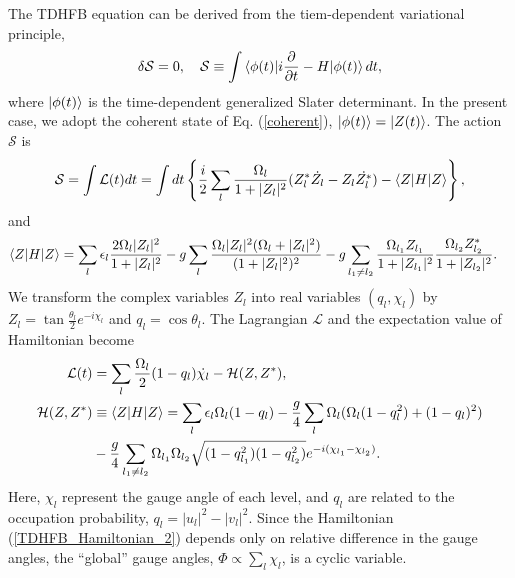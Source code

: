 \documentclass[%
superscriptaddress,
preprint,
showpacs,
nofootinbib,
amsmath,amssymb,
prc,
floatfix ]%
{revtex4-1}
\begin{document}
The TDHFB equation can be derived from the tiem-dependent variational
principle,
\begin{equation}
	\delta \mathcal{S} = 0,
	\quad
	\mathcal{S}\equiv
	\int \braket{\phi(t)|i\frac{\partial}{\partial t}-H|\phi(t)}dt,
  \label{TDHFB}
\end{equation}
where $\ket{\phi(t)}$ is the time-dependent generalized Slater determinant.
In the present case, we adopt the coherent state of Eq. (\ref{coherent}),
$\ket{\phi(t)}=\ket{Z(t)}$.
The action $\mathcal{S}$ is
\begin{equation}
	\mathcal{S}  = \int \mathcal{L}(t) dt
	= \int dt \left\{ \frac{i}{2} \sum_l \frac{\Omega_l}{1+|Z_l|^2}
  (Z_l^*\dot{Z_l}-Z_l\dot{Z_l^*}) - \braket{Z|H|Z} \right\} ,
\label{S}
\end{equation}
and
\begin{align}
  \braket{Z|H|Z} &= \sum_l \epsilon_l \frac{2\Omega_l |Z_l|^2}{1+|Z_l|^2}
  -g \sum_l \frac{\Omega_l|Z_l|^2(\Omega_l+|Z_l|^2)}{(1+|Z_l|^2)^2}
  -g \sum_{l_1 \neq l_2} \frac{\Omega_{l_1}Z_{l_1}}{1+|Z_{l_1}|^2}\frac{\Omega_{l_2}Z_{l_2}^*}{1+|Z_{l_2}|^2}.
	\label{TDHFB_Hamiltonian_1}
\end{align}
We transform the complex variables $Z_l$ into real variables $(q_l,\chi_l)$
by $Z_l = \tan{\frac{\theta_l}{2}}e^{-i\chi_l}$ and $q_l=\cos{\theta_l}$.
The Lagrangian $\mathcal{L}$ and the expectation value of Hamiltonian become
\begin{align}
\mathcal{L}(t) &= \sum_l \frac{\Omega_l}{2}
	(1-q_l)\dot{\chi_l} - \mathcal{H}(Z,Z^*) ,\\
	\mathcal{H}(Z,Z^*)&\equiv \braket{Z|H|Z} = \sum_l \epsilon_l\Omega_l(1- q_l) - \frac{g}{4}\sum_l \Omega_l (\Omega_l(1-q_l^2)+(1-q_l)^2) \nonumber \\
&- \frac{g}{4}\sum_{l_1\neq l_2} \Omega_{l_1}\Omega_{l_2}\sqrt{(1-q_{l_1}^2)(1-q_{l_2}^2)}e^{-i(\chi_{l_1}-\chi_{l_2})}   .
\label{TDHFB_Hamiltonian_2}
\end{align}
Here, $\chi_l$ represent the gauge angle of each level,
and $q_l$ are related to the occupation probability, $q_l=|u_l|^2-|v_l|^2$.
Since the Hamiltonian (\ref{TDHFB_Hamiltonian_2}) depends only on
relative difference in the gauge angles,
the ``global'' gauge angles, $\Phi\propto\sum_l \chi_l$,
is a cyclic variable.
\end{document}
